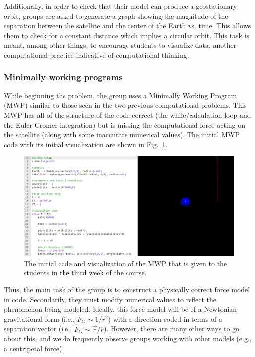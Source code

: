 \documentclass{msuphddissertation}
\begin{document}
\begin{doublespace}
Additionally, in order to check that their model can produce a geostationary orbit, groups are asked to generate a graph showing the magnitude of the separation between the satellite and the center of the Earth vs. time.  This allows them to check for a constant distance which implies a circular orbit.  This task is meant, among other things, to encourage students to visualize data, another computational practice indicative of computational thinking.

\subsubsection{Minimally working programs}\label{CH3:MWPs}

While beginning the problem, the group uses a Minimally Working Program (MWP) similar to those seen in the two previous computational problems.  This MWP has all of the structure of the code correct (the while/calculation loop and the Euler-Cromer integration) but is missing the computational force acting on the satellite (along with some inaccurate numerical values).  The initial MWP code with its initial visualization are shown in Fig.~\ref{CH3:InitialCodeVisual}.

\begin{figure}[ht]\centering
\includegraphics[width=\textwidth]{images/CH3InitialCodeVisual.pdf}
\caption{The initial code and visualization of the MWP that is given to the students in the third week of the course.}\label{CH3:InitialCodeVisual}
\end{figure}

Thus, the main task of the group is to construct a physically correct force model in code.  Secondarily, they must modify numerical values to reflect the phenomenon being modeled.  Ideally, this force model will be of a Newtonian gravitational form (i.e., $F_{G}\sim1/r^{2}$) with a direction coded in terms of a separation vector (i.e., $\hat{F}_{G}\sim\vec{r}/r$).  However, there are many other ways to go about this, and we do frequently observe groups working with other models (e.g., a centripetal force).


\end{doublespace}
\end{document}
